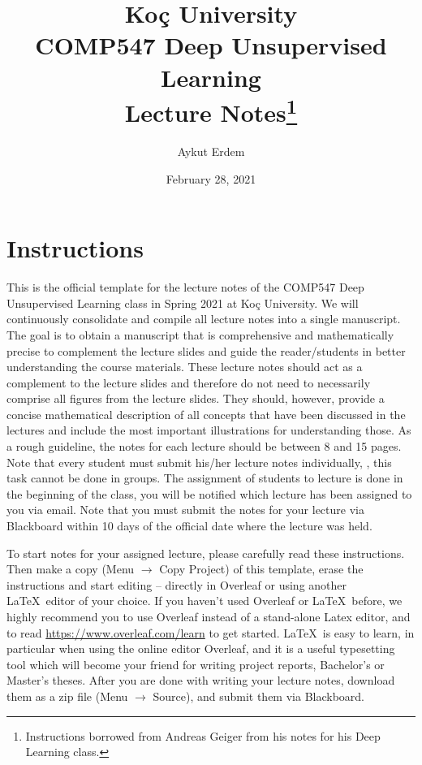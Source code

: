 \documentclass{article}
\title{Ko\c{c} University \\COMP547 Deep Unsupervised Learning\\ Lecture Notes\footnote{Instructions borrowed from Andreas Geiger from his notes for his Deep Learning class.}}
\author{Aykut Erdem}
\date{February 28, 2021}
\begin{document}
\maketitle

\setcounter{section}{0}

\section{Instructions}

This is the official template for the lecture notes of the COMP547 Deep Unsupervised Learning class in Spring 2021 at Ko\c{c} University. We will continuously consolidate and compile all lecture notes into a single manuscript. The goal is to obtain a manuscript that is comprehensive and mathematically precise to complement the lecture slides and guide the reader/students in better understanding the course materials. These lecture notes should act as a complement to the lecture slides and therefore do not need to necessarily comprise all figures from the lecture slides. They should, however, provide a concise mathematical description of all concepts that have been discussed in the lectures and include the most important illustrations for understanding those. As a rough guideline, the notes for each lecture should be between 8 and 15 pages. Note that every student must submit his/her lecture notes individually, \ie, this task cannot be done in groups. The assignment of students to lecture is done in the beginning of the class, you will be notified which lecture has been assigned to you via email. Note that you must submit the notes for your lecture via Blackboard within 10 days of the official date where the lecture was held.

To start notes for your assigned lecture, please carefully read these instructions. Then make a copy (Menu $\rightarrow$ Copy Project) of this template, erase the instructions and start editing -- directly in Overleaf or using another \LaTeX~editor of your choice. If you haven't used Overleaf or \LaTeX~before, we highly recommend you to use Overleaf instead of a stand-alone Latex editor, and to read \url{https://www.overleaf.com/learn} to get started. \LaTeX~is easy to learn, in particular when using the online editor Overleaf, and it is a useful typesetting tool which will become your friend for writing project reports, Bachelor's or Master's theses. After you are done with writing your lecture notes, download them as a zip file (Menu $\rightarrow$ Source), and submit them via Blackboard.
\end{document}
